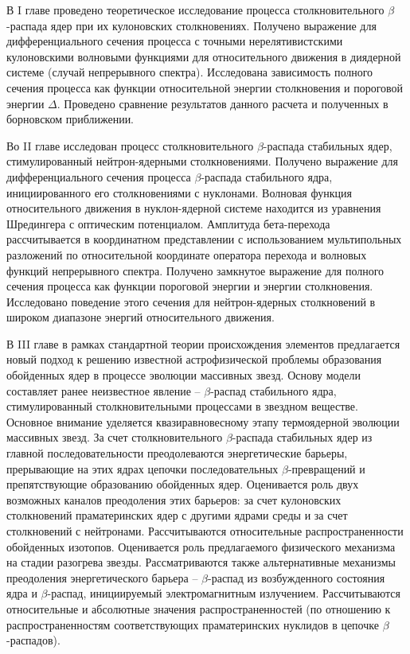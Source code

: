 В I главе проведено теоретическое исследование процесса столкновительного
$\beta$-распада ядер при их кулоновских столкновениях.
Получено выражение для дифференциального сечения процесса с
точными нерелятивистскими кулоновскими волновыми
функциями для относительного движения в диядерной
системе (случай непрерывного спектра).
Исследована
зависимость полного сечения процесса как функции
относительной энергии столкновения и пороговой энергии
$\Delta$. Проведено сравнение результатов данного расчета и
полученных в борновском приближении.


Во II главе исследован процесс столкновительного $\beta$-распада
         стабильных ядер,
         стимулированный нейтрон-ядерными столкновениями.
Получено выражение для дифференциального сечения процесса $\beta$-распада
стабильного
ядра, инициированного его столкновениями с нуклонами. Волновая функция
относительного движения
в нуклон-ядерной системе находится из уравнения Шредингера с оптическим
потенциалом. Амплитуда
бета-перехода рассчитывается в координатном представлении с использованием
мультипольных разложений
по относительной координате  оператора перехода и волновых функций
непрерывного спектра.
Получено замкнутое выражение для полного сечения процесса как функции
пороговой
энергии и энергии столкновения. Исследовано поведение этого сечения для
нейтрон-ядерных столкновений в широком
диапазоне энергий относительного движения.


В III главе в рамках стандартной теории происхождения элементов
         предлагается новый подход к решению известной
         астрофизической проблемы образования обойденных ядер в
         процессе эволюции массивных звезд. Основу модели
         составляет ранее неизвестное явление -- $\beta$-распад
         стабильного ядра, стимулированный столкновительными
         процессами в звездном веществе. Основное внимание
         уделяется квазиравновесному этапу термоядерной эволюции
         массивных звезд. За счет столкновительного
         $\beta$-распада стабильных ядер из главной
         последовательности преодолеваются энергетические
         барьеры, прерывающие на этих ядрах цепочки
         последовательных $\beta$-превращений и препятствующие
         образованию обойденных ядер. Оценивается роль двух
         возможных каналов преодоления этих барьеров: за счет
         кулоновских столкновений праматеринских ядер с другими
         ядрами среды и за счет столкновений с нейтронами.
         Рассчитываются относительные
         распространенности обойденных изотопов. Оценивается роль
         предлагаемого физического механизма на стадии разогрева
         звезды.
         Рассматриваются также альтернативные механизмы преодоления
         энергетического барьера -- $\beta$-распад из возбужденного состояния
         ядра и $\beta$-распад, инициируемый электромагнитным излучением.
         Рассчитываются относительные и абсолютные значения распространенностей
         (по отношению к распространенностям соответствующих праматеринских
         нуклидов в цепочке $\beta$-распадов).

